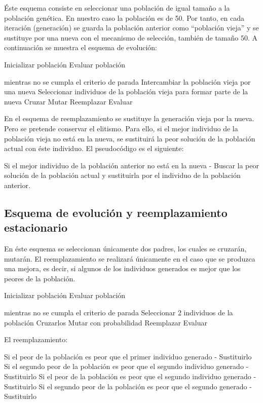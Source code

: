 \documentclass[twoside]{article}
\begin{document}
Éste esquema consiste en seleccionar una población de igual tamaño a la población
genética. En nuestro caso la población es de 50. Por tanto, en cada iteración (generación)
se guarda la población anterior como “población vieja” y se sustituye por una nueva
con el mecanismo de selección, también de tamaño 50. A continuación se muestra el esquema
de evolución:

\begin{pythoncode}
Inicializar población
Evaluar población

mientras no se cumpla el criterio de parada
    Intercambiar la población vieja por una nueva
    Seleccionar individuos de la población vieja para formar parte de la nueva
    Cruzar
    Mutar
    Reemplazar
    Evaluar
\end{pythoncode}

En el esquema de reemplazamiento se sustituye la generación vieja por la nueva.
Pero se pretende conservar el elitismo. Para ello, si el mejor individuo
de la población vieja no está en la nueva, se sustituirá la peor solución
de la población actual con éste individuo. El pseudocódigo es el siguiente:

\begin{pythoncode}
Si el mejor individuo de la población anterior no está en la nueva
    - Buscar la peor solución de la población actual y sustituirla por el
      individuo de la población anterior.
\end{pythoncode}

\subsection{Esquema de evolución y reemplazamiento estacionario}

En éste esquema se seleccionan únicamente dos padres, los cuales se
cruzarán, mutarán. El reemplazamiento se realizará únicamente en el caso
que se produzca una mejora, es decir, si algunos de los individuos generados
es mejor que los peores de la población.

\begin{pythoncode}
Inicializar población
Evaluar población

mientras no se cumpla el criterio de parada
    Seleccionar 2 individuos de la población
    Cruzarlos
    Mutar con probabilidad
    Reemplazar
    Evaluar
\end{pythoncode}

El reemplazamiento:

\begin{pythoncode}
Si el peor de la población es peor que el primer individuo generado
    - Sustituirlo
Si el segundo peor de la población es peor que el segundo individuo generado
    - Sustituirlo
Si el peor de la población es peor que el segundo individuo generado
    - Sustituirlo
Si el segundo peor de la población es peor que el segundo generado
    - Sustituirlo
\end{pythoncode}
\end{document}
